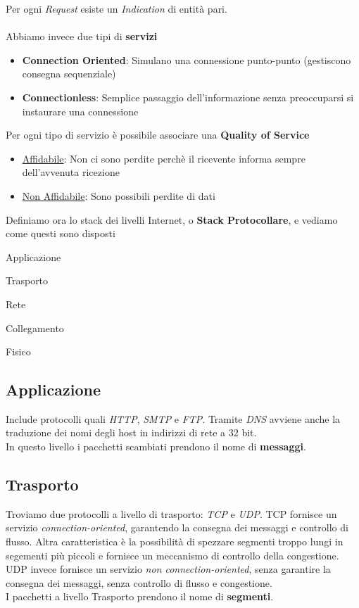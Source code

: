 \documentclass{article}
\begin{document}
        Per ogni \textit{Request} esiste un \textit{Indication} di entità pari.\\
        \\
        Abbiamo invece due tipi di \textbf{servizi}
        \begin{itemize}
            \item \textbf{Connection Oriented}: Simulano una connessione punto-punto (gestiscono consegna sequenziale)
            \item \textbf{Connectionless}: Semplice passaggio dell'informazione senza preoccuparsi si instaurare una connessione
        \end{itemize} 
        Per ogni tipo di servizio è possibile associare una \textbf{Quality of Service}
        \begin{itemize}
            \item \underline{Affidabile}: Non ci sono perdite perchè il ricevente informa sempre dell'avvenuta ricezione
            \item \underline{Non Affidabile}: Sono possibili perdite di dati
        \end{itemize}
        Definiamo ora lo stack dei livelli Internet, o \textbf{Stack Protocollare}, e vediamo come questi sono disposti
        \begin{etaremune}
            \item Applicazione
            \item Trasporto
            \item Rete
            \item Collegamento
            \item Fisico
        \end{etaremune}

        \subsection{Applicazione}
            Include protocolli quali \textit{HTTP}, \textit{SMTP} e \textit{FTP}. Tramite \textit{DNS} avviene anche la traduzione dei nomi degli host in indirizzi di rete a 32 bit.\\
            In questo livello i pacchetti scambiati prendono il nome di \textbf{messaggi}.

        \subsection{Trasporto}
            Troviamo due protocolli a livello di trasporto: \textit{TCP} e \textit{UDP}. TCP fornisce un servizio \textit{connection-oriented}, garantendo la consegna dei messaggi e controllo di flusso. Altra caratteristica è la possibilità di spezzare segmenti troppo lungi in segementi più piccoli e fornisce un meccanismo di controllo della congestione.\\
            UDP invece fornisce un servizio \textit{non connection-oriented}, senza garantire la consegna dei messaggi, senza controllo di flusso e congestione.\\
            I pacchetti a livello Trasporto prendono il nome di \textbf{segmenti}.
\end{document}

